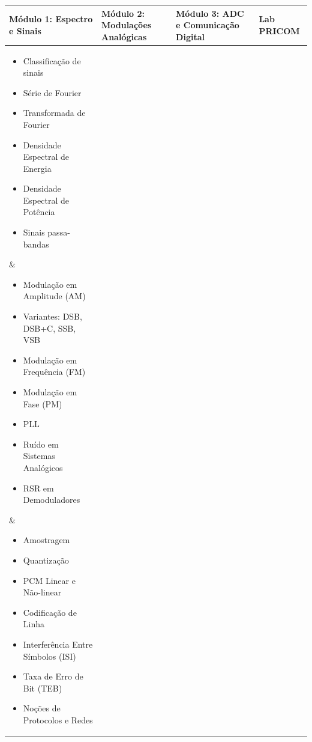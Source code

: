 \documentclass[11pt,a4paper]{article}
\begin{document}
\begin{center}
\small
\begin{tabular}{|p{}|p{}|p{}|p{}|}
\hline
\textbf{Módulo 1: Espectro e Sinais} & \textbf{Módulo 2: Modulações Analógicas} & \textbf{Módulo 3: ADC e Comunicação Digital} & \textbf{Lab PRICOM} \\
\hline
\parbox[t]{0.20\textwidth}{%
  \vspace{0.2em}
  \begin{itemize}[noitemsep, leftmargin=*, nosep, font=\small]
    \item Classificação de sinais
    \item Série de Fourier
    \item Transformada de Fourier
    \item Densidade Espectral de Energia
    \item Densidade Espectral de Potência
    \item Sinais passa-bandas
  \end{itemize}
  \vspace{0.2em}
} &
\parbox[t]{0.20\textwidth}{%
  \vspace{0.2em}
  \begin{itemize}[noitemsep, leftmargin=*, nosep, font=\small]
    \item Modulação em Amplitude (AM)
    \item Variantes: DSB, DSB+C, SSB, VSB
    \item Modulação em Frequência (FM)
    \item Modulação em Fase (PM)
    \item PLL
    \item Ruído em Sistemas Analógicos
    \item RSR em Demoduladores
  \end{itemize}
  \vspace{0.2em}
} &
\parbox[t]{0.20\textwidth}{%
  \vspace{0.2em}
  \begin{itemize}[noitemsep, leftmargin=*, nosep, font=\small]
    \item Amostragem
    \item Quantização
    \item PCM Linear e Não-linear
    \item Codificação de Linha
    \item Interferência Entre Símbolos (ISI)
    \item Taxa de Erro de Bit (TEB)
    \item Noções de Protocolos e Redes

\end{itemize}}
\end{tabular}
\end{center}
\end{document}
